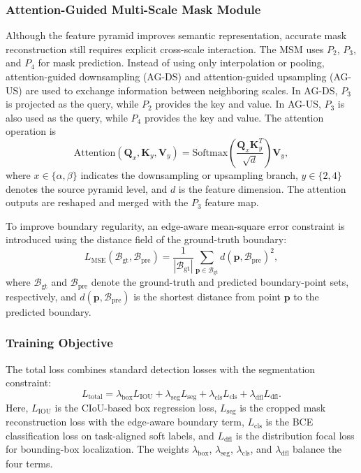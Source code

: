 \subsubsection{Attention-Guided Multi-Scale Mask Module}
Although the feature pyramid improves semantic representation, accurate mask reconstruction still requires explicit cross-scale interaction. The MSM uses $P_2$, $P_3$, and $P_4$ for mask prediction. Instead of using only interpolation or pooling, attention-guided downsampling (AG-DS) and attention-guided upsampling (AG-US) are used to exchange information between neighboring scales. In AG-DS, $P_3$ is projected as the query, while $P_2$ provides the key and value. In AG-US, $P_3$ is also used as the query, while $P_4$ provides the key and value. The attention operation is
\begin{equation}
\mathrm{Attention}(\boldsymbol{Q}_{x},\boldsymbol{K}_{y},\boldsymbol{V}_{y})=
\mathrm{Softmax}\left(\frac{\boldsymbol{Q}_{x}\boldsymbol{K}_{y}^{T}}{\sqrt{d}}\right)\boldsymbol{V}_{y},
\label{eq:attention}
\end{equation}
where $x\in\{\alpha,\beta\}$ indicates the downsampling or upsampling branch, $y\in\{2,4\}$ denotes the source pyramid level, and $d$ is the feature dimension. The attention outputs are reshaped and merged with the $P_3$ feature map.

To improve boundary regularity, an edge-aware mean-square error constraint is introduced using the distance field of the ground-truth boundary:
\begin{equation}
L_{\mathrm{MSE}}(\mathcal{B}_{\text{gt}},\mathcal{B}_{\text{pre}})=
\frac{1}{|\mathcal{B}_{\text{gt}}|}\sum_{\boldsymbol{p}\in\mathcal{B}_{\text{gt}}}d(\boldsymbol{p},\mathcal{B}_{\text{pre}})^{2},
\label{eq:mse}
\end{equation}
where $\mathcal{B}_{\text{gt}}$ and $\mathcal{B}_{\text{pre}}$ denote the ground-truth and predicted boundary-point sets, respectively, and $d(\boldsymbol{p},\mathcal{B}_{\text{pre}})$ is the shortest distance from point $\boldsymbol{p}$ to the predicted boundary.

\subsubsection{Training Objective}
The total loss combines standard detection losses with the segmentation constraint:
\begin{equation}
L_{\text{total}}=\lambda_{\text{box}}L_{\text{IOU}}+\lambda_{\text{seg}}L_{\text{seg}}+\lambda_{\text{cls}}L_{\text{cls}}+\lambda_{\text{dfl}}L_{\text{dfl}}.
\label{eq:loss}
\end{equation}
Here, $L_{\text{IOU}}$ is the CIoU-based box regression loss, $L_{\text{seg}}$ is the cropped mask reconstruction loss with the edge-aware boundary term, $L_{\text{cls}}$ is the BCE classification loss on task-aligned soft labels, and $L_{\text{dfl}}$ is the distribution focal loss for bounding-box localization. The weights $\lambda_{\text{box}}$, $\lambda_{\text{seg}}$, $\lambda_{\text{cls}}$, and $\lambda_{\text{dfl}}$ balance the four terms.

